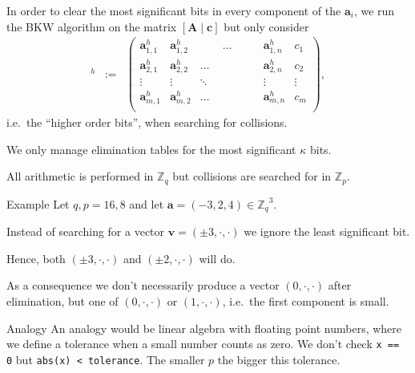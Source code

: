 \documentclass[10pt]{beamer}
\renewcommand{\vec}[1]{\mathbf{#1}\xspace}
\newcommand{\Z}{\ensuremath{\mathbb{Z}}\xspace}
\newcommand{\Zq}{\ensuremath{\Z_q}\xspace}
\newcommand{\Zp}{\ensuremath{\mathbb{Z}_p}\xspace}
\begin{document}
\begin{frame}
In order to clear the most significant bits in every component of the $\vec{a}_{i}$, we run the BKW algorithm on the matrix $[\vec{A} \mid \vec{c}]$ but only consider
\begin{eqnarray*}
[\vec{A},\vec{c}]^h &:=& \left(\begin{array}{ccccc}
       \vec{a}_{1,1}^h & \vec{a}_{1,2}^h & \hspace{2em} \dots \hspace{2em} & \vec{a}_{1,n}^h & c_1\\
       \vec{a}_{2,1}^h & \vec{a}_{2,2}^h & \dots & \vec{a}_{2,n}^h & c_2\\
        \vdots & \vdots & \ddots & \vdots & \vdots\\
       \vec{a}_{m,1}^h & \vec{a}_{m,2}^h & \dots & \vec{a}_{m,n}^h & c_{m}\\
      \end{array}\right),
\end{eqnarray*}
i.e.\ the ``higher order bits'', when searching for collisions. 

\vspace{1em}

We only manage elimination tables for the most significant $\kappa$ bits.

All arithmetic is performed in $\Zq$ but collisions are searched for in $\Zp$.

\framebreak

\begin{exampleblock}{Example}
Let $q,p = 16,8$ and let $\vec{a} = (-3,2,4) \in \Zq^3$. 

\vspace{1em}

Instead of searching for a vector $\vec{v} = (\pm3,\cdot,\cdot)$ we ignore the least significant bit. 

\vspace{1em}

Hence, both $(\pm 3,\cdot,\cdot)$ and $(\pm 2,\cdot,\cdot)$ will do.

\vspace{1em}

As a consequence we don't necessarily produce a vector $(0, \cdot, \cdot)$ after elimination, but one of $(0, \cdot, \cdot)$ or $(1, \cdot, \cdot)$, i.e.\ the first component is small.
\end{exampleblock}

\begin{block}{Analogy}
An analogy would be linear algebra with floating point numbers, where we define a tolerance when a small number counts as zero. We don't check \verb|x == 0| but \verb|abs(x) < tolerance|. The smaller $p$ the bigger this tolerance.
\end{block}


\end{frame}
\end{document}

